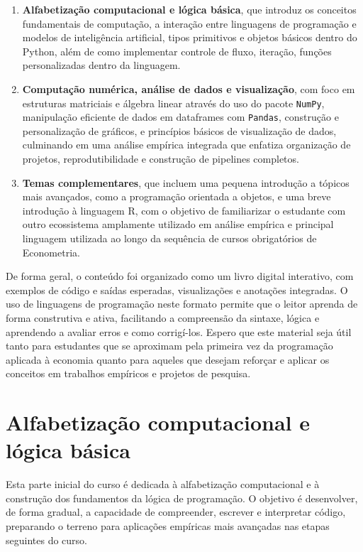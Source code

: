 \documentclass[
  brazilian,
  letterpaper,
  DIV=11,
  numbers=noendperiod]{scrreprt}
\begin{document}
\begin{enumerate}
\def\labelenumi{\arabic{enumi}.}
\item
  \textbf{Alfabetização computacional e lógica básica}, que introduz os
  conceitos fundamentais de computação, a interação entre linguagens de
  programação e modelos de inteligência artificial, tipos primitivos e
  objetos básicos dentro do Python, além de como implementar controle de
  fluxo, iteração, funções personalizadas dentro da linguagem.
\item
  \textbf{Computação numérica, análise de dados e visualização}, com
  foco em estruturas matriciais e álgebra linear através do uso do
  pacote \texttt{NumPy}, manipulação eficiente de dados em dataframes
  com \texttt{Pandas}, construção e personalização de gráficos, e
  princípios básicos de visualização de dados, culminando em uma análise
  empírica integrada que enfatiza organização de projetos,
  reprodutibilidade e construção de pipelines completos.
\item
  \textbf{Temas complementares}, que incluem uma pequena introdução a
  tópicos mais avançados, como a programação orientada a objetos, e uma
  breve introdução à linguagem R, com o objetivo de familiarizar o
  estudante com outro ecossistema amplamente utilizado em análise
  empírica e principal linguagem utilizada ao longo da sequência de
  cursos obrigatórios de Econometria.
\end{enumerate}

De forma geral, o conteúdo foi organizado como um livro digital
interativo, com exemplos de código e saídas esperadas, visualizações e
anotações integradas. O uso de linguagens de programação neste formato
permite que o leitor aprenda de forma construtiva e ativa, facilitando a
compreensão da sintaxe, lógica e aprendendo a avaliar erros e como
corrigí-los. Espero que este material seja útil tanto para estudantes
que se aproximam pela primeira vez da programação aplicada à economia
quanto para aqueles que desejam reforçar e aplicar os conceitos em
trabalhos empíricos e projetos de pesquisa.

\part{Alfabetização computacional e lógica básica}

Esta parte inicial do curso é dedicada à alfabetização computacional e à
construção dos fundamentos da lógica de programação. O objetivo é
desenvolver, de forma gradual, a capacidade de compreender, escrever e
interpretar código, preparando o terreno para aplicações empíricas mais
avançadas nas etapas seguintes do curso.
\end{document}
